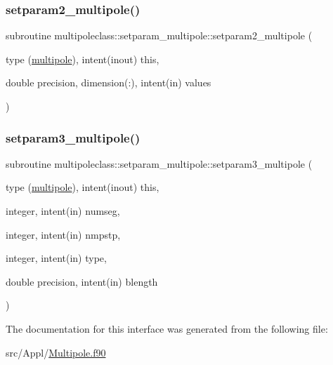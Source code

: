 \mbox{\label{interfacemultipoleclass_1_1setparam__multipole_ab30b441269dcac72360968f590e9cf28}} 
\subsubsection{\texorpdfstring{setparam2\_multipole()}{setparam2\_multipole()}}
{\footnotesize\ttfamily subroutine multipoleclass\+::setparam\+\_\+multipole\+::setparam2\+\_\+multipole (\begin{DoxyParamCaption}\item[{type (\mbox{\hyperlink{namespacemultipoleclass_structmultipoleclass_1_1multipole}{multipole}}), intent(inout)}]{this,  }\item[{double precision, dimension(\+:), intent(in)}]{values }\end{DoxyParamCaption})}

\mbox{\label{interfacemultipoleclass_1_1setparam__multipole_a621d418b85670ef483f41dc99c72b117}} 
\subsubsection{\texorpdfstring{setparam3\_multipole()}{setparam3\_multipole()}}
{\footnotesize\ttfamily subroutine multipoleclass\+::setparam\+\_\+multipole\+::setparam3\+\_\+multipole (\begin{DoxyParamCaption}\item[{type (\mbox{\hyperlink{namespacemultipoleclass_structmultipoleclass_1_1multipole}{multipole}}), intent(inout)}]{this,  }\item[{integer, intent(in)}]{numseg,  }\item[{integer, intent(in)}]{nmpstp,  }\item[{integer, intent(in)}]{type,  }\item[{double precision, intent(in)}]{blength }\end{DoxyParamCaption})}



The documentation for this interface was generated from the following file\+:\begin{DoxyCompactItemize}
\item 
src/\+Appl/\mbox{\hyperlink{_multipole_8f90}{Multipole.\+f90}}\end{DoxyCompactItemize}
